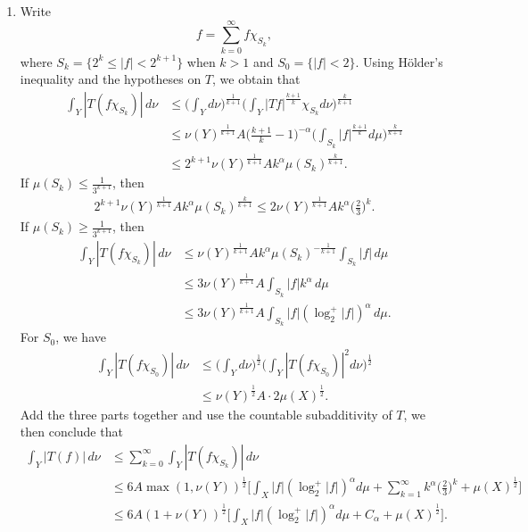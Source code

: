 \begin{enumerate}
\item[1.3.7.]
   Write $$f=\sum_{k=0}^{\infty}f\chi_{S_{k}},$$
   where $S_{k}=\{2^{k} \leq |f| < 2^{k+1}\}$ when $k>1$ 
   and $S_{0}=\{|f|<2\}$. Using Hölder's inequality and the hypotheses on $T$, we obtain that
   \begin{equation*}\begin{aligned}
   \int_{Y}|T(f\chi_{S_{k}})|\,d\nu 
   &\leq \bigg(\int_{Y}d\nu\bigg)^{\frac{1}{k+1}}
   \bigg(\int_{Y}|Tf|^{\frac{k+1}{k}}\chi_{S_{k}}d\nu\bigg)^{\frac{k}{k+1}}
   \\&\leq \nu(Y)^{\frac{1}{k+1}}A\Big(\frac{k+1}{k}-1\Big)^{-\alpha}
   \bigg(\int_{S_{k}}|f|^{\frac{k+1}{k}}d\mu\bigg)^{\frac{k}{k+1}}
   \\&\leq 2^{k+1}\nu(Y)^{\frac{1}{k+1}}Ak^{\alpha}\mu(S_{k})^{\frac{k}{k+1}}.
   \end{aligned}\end{equation*}
   If $\mu(S_{k}) \leq \frac{1}{3^{k+1}}$, then 
   \begin{equation*}\begin{aligned}
   2^{k+1}\nu(Y)^{\frac{1}{k+1}}Ak^{\alpha}\mu(S_{k})^{\frac{k}{k+1}} 
   \leq 2\nu(Y)^{\frac{1}{k+1}}Ak^{\alpha}\Big(\frac{2}{3}\Big)^{k}.
   \end{aligned}\end{equation*}
   If $\mu(S_{k}) \geq \frac{1}{3^{k+1}}$, then
   \begin{equation*}\begin{aligned}
   \int_{Y}|T(f\chi_{S_{k}})|\,d\nu 
   &\leq \nu(Y)^{\frac{1}{k+1}}Ak^{\alpha}\mu(S_k)^{-\frac{1}{k+1}}\int_{S_{k}}|f|\,d\mu\\
   &\leq 3\nu(Y)^{\frac{1}{k+1}}A\int_{S_{k}}|f|k^{\alpha}\,d\mu\\
   &\leq 3\nu(Y)^{\frac{1}{k+1}}A\int_{S_{k}}|f|(\log_{2}^{+}|f|)^{\alpha}\,d\mu.
   \end{aligned}\end{equation*}
   For $S_{0}$, we have
   \begin{equation*}\begin{aligned}
   \int_{Y}|T(f\chi_{S_{0}})|\,d\nu 
   &\leq \bigg(\int_{Y}d\nu\bigg)^{\frac{1}{2}}
   \bigg(\int_{Y}|T(f\chi_{S_{0}})|^{2}d\nu\bigg)^{\frac{1}{2}}\\
   &\leq\nu(Y)^{\frac{1}{2}}A\cdot2\mu(X)^{\frac{1}{2}}.
   \end{aligned}\end{equation*}
   Add the three parts together and use the countable subadditivity of $T$, 
   we then conclude that
   \begin{equation*}\begin{aligned}
   \int_{Y}|T(f)|\,d\nu &\leq\sum_{k=0}^\infty\int_Y|T(f\chi_{S_k})|\,d\nu\\
   &\leq 6A\max(1,\nu(Y))^\frac{1}{2}\bigg[\int_{X}|f|(\log_{2}^{+}|f|)^{\alpha}d\mu
   +\sum_{k=1}^\infty k^\alpha\Big(\frac{2}{3}\Big)^k+\mu(X)^{\frac{1}{2}}\bigg]\\
   &\leq 6A(1+\nu(Y))^\frac{1}{2}
   \bigg[\int_{X}|f|(\log_{2}^{+}|f|)^{\alpha}d\mu
   +C_{\alpha}+\mu(X)^{\frac{1}{2}}\bigg].
   \end{aligned}\end{equation*}


\end{enumerate}
